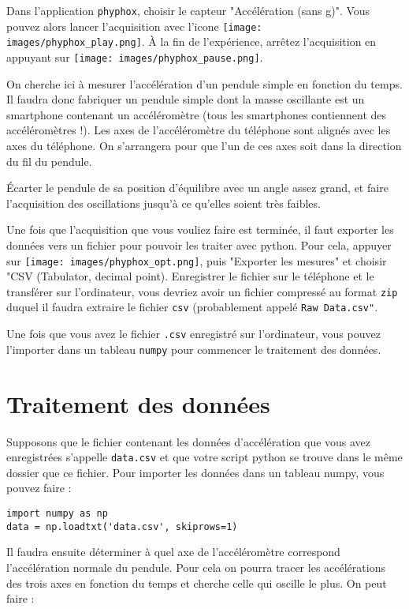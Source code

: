 \documentclass[a4paper]{tp}
\begin{document}
Dans l'application \texttt{phyphox}, choisir le capteur "Accélération (sans g)". Vous pouvez alors lancer l'acquisition avec l'icone \texttt{[image: images/phyphox\_play.png]}. À la fin de l'expérience, arrêtez l'acquisition en appuyant sur \texttt{[image: images/phyphox\_pause.png]}. 

On cherche ici à mesurer l'accélération d'un pendule simple en fonction du temps. Il faudra donc fabriquer un pendule simple dont la masse oscillante est un smartphone contenant un accéléromètre (tous les smartphones contiennent des accéléromètres !). Les axes de l'accéléromètre du téléphone sont alignés avec les axes du téléphone. On s'arrangera pour que l'un de ces axes soit dans la direction du fil du pendule.

Écarter le pendule de sa position d'équilibre avec un angle assez grand, et faire l'acquisition des oscillations jusqu'à ce qu'elles soient très faibles.

Une fois que l'acquisition que vous vouliez faire est terminée, il faut exporter les données vers un fichier pour pouvoir les traiter avec python. Pour cela, appuyer sur \texttt{[image: images/phyphox\_opt.png]}, puis "Exporter les mesures" et choisir "CSV (Tabulator, decimal point). Enregistrer le fichier sur le téléphone et le transférer sur l'ordinateur, vous devriez avoir un fichier compressé au format \texttt{zip} duquel il faudra extraire le fichier \texttt{csv} (probablement appelé \texttt{Raw Data.csv"}.

Une fois que vous avez le fichier \texttt{.csv} enregistré sur l'ordinateur, vous pouvez l'importer dans un tableau \texttt{numpy} pour commencer le traitement des données. 

\section{Traitement des données}%
\label{sec:traitement_des_donnees}

Supposons que le fichier contenant les données d'accélération que vous avez enregistrées s'appelle \texttt{data.csv} et que votre script python se trouve dans le même dossier que ce fichier. Pour importer les données dans un tableau numpy, vous pouvez faire :

\begin{verbatim}
import numpy as np
data = np.loadtxt('data.csv', skiprows=1)
\end{verbatim}

Il faudra ensuite déterminer à quel axe de l'accéléromètre correspond l'accélération normale du pendule. Pour cela on pourra tracer les accélérations des trois axes en fonction du temps et cherche celle qui oscille le plus. On peut faire :
\end{document}
